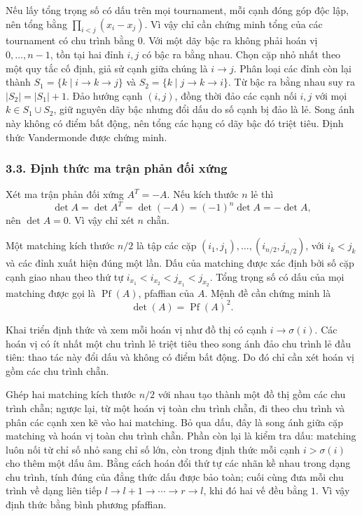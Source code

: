 \documentclass[11pt]{article}
\begin{document}
Nếu lấy tổng trọng số có dấu trên mọi tournament, mỗi cạnh đóng góp độc lập,
nên tổng bằng \(\prod_{i<j}(x_i-x_j)\). Vì vậy chỉ cần chứng minh tổng của các
tournament có chu trình bằng \(0\). Với một dãy bậc ra không phải hoán vị
\(0,\ldots,n-1\), tồn tại hai đỉnh \(i,j\) có bậc ra bằng nhau. Chọn cặp nhỏ
nhất theo một quy tắc cố định, giả sử cạnh giữa chúng là \(i\to j\). Phân loại
các đỉnh còn lại thành \(S_1=\{k\mid i\to k\to j\}\) và
\(S_2=\{k\mid j\to k\to i\}\). Từ bậc ra bằng nhau suy ra
\(|S_2|=|S_1|+1\). Đảo hướng cạnh \((i,j)\), đồng thời đảo các cạnh nối
\(i,j\) với mọi \(k\in S_1\cup S_2\), giữ nguyên dãy bậc nhưng đổi dấu do số
cạnh bị đảo là lẻ. Song ánh này không có điểm bất động, nên tổng các hạng có
dãy bậc đó triệt tiêu. Định thức Vandermonde được chứng minh.

\subsubsection*{3.3. Định thức ma trận phản đối xứng}

Xét ma trận phản đối xứng \(A^T=-A\). Nếu kích thước \(n\) lẻ thì
\[
\det A=\det A^T=\det(-A)=(-1)^n\det A=-\det A,
\]
nên \(\det A=0\). Vì vậy chỉ xét \(n\) chẵn.

Một matching kích thước \(n/2\) là tập các cặp
\((i_1,j_1),\ldots,(i_{n/2},j_{n/2})\), với \(i_k<j_k\) và các đỉnh xuất hiện
đúng một lần. Dấu của matching được xác định bởi số cặp cạnh giao nhau theo
thứ tự \(i_{x_1}<i_{x_2}<j_{x_1}<j_{x_2}\). Tổng trọng số có dấu của mọi
matching được gọi là \(\operatorname{Pf}(A)\), pfaffian của \(A\). Mệnh đề cần
chứng minh là
\[
\det(A)=\operatorname{Pf}(A)^2.
\]

Khai triển định thức và xem mỗi hoán vị như đồ thị có cạnh
\(i\to\sigma(i)\). Các hoán vị có ít nhất một chu trình lẻ triệt tiêu theo
song ánh đảo chu trình lẻ đầu tiên: thao tác này đổi dấu và không có điểm bất
động. Do đó chỉ cần xét hoán vị gồm các chu trình chẵn.

Ghép hai matching kích thước \(n/2\) với nhau tạo thành một đồ thị gồm các chu
trình chẵn; ngược lại, từ một hoán vị toàn chu trình chẵn, đi theo chu trình
và phân các cạnh xen kẽ vào hai matching. Bỏ qua dấu, đây là song ánh giữa cặp
matching và hoán vị toàn chu trình chẵn. Phần còn lại là kiểm tra dấu: matching
luôn nối từ chỉ số nhỏ sang chỉ số lớn, còn trong định thức mỗi cạnh
\(i>\sigma(i)\) cho thêm một dấu âm. Bằng cách hoán đổi thứ tự các nhãn kề nhau
trong dạng chu trình, tính đúng của đẳng thức dấu được bảo toàn; cuối cùng đưa
mỗi chu trình về dạng liên tiếp \(l\to l+1\to\cdots\to r\to l\), khi đó hai
vế đều bằng \(1\). Vì vậy định thức bằng bình phương pfaffian.
\end{document}
